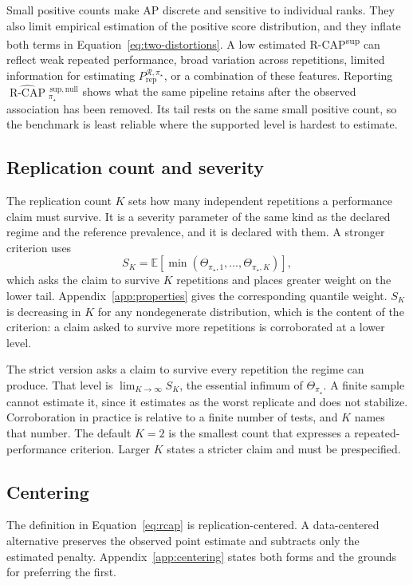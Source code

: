 \documentclass[11pt]{article}
\newcommand{\Regime}{\mathcal{R}}
\newcommand{\E}{\mathbb{E}}
\newcommand{\RCAPnullHat}{\widehat{\operatorname{R\text{-}CAP}}{}^{\,\mathrm{sup,null}}_{\pi_\star}}
\newcommand{\PRep}{P_{\mathrm{rep}}^{\Regime,\pi_\star}}
\theoremstyle{remark}
\begin{document}
Small positive counts make AP discrete and sensitive to individual ranks. They also limit empirical estimation of the positive score distribution, and they inflate both terms in Equation~\eqref{eq:two-distortions}. A low estimated R-CAP\textsuperscript{sup} can reflect weak repeated performance, broad variation across repetitions, limited information for estimating $\PRep$, or a combination of these features. Reporting $\RCAPnullHat$ shows what the same pipeline retains after the observed association has been removed. Its tail rests on the same small positive count, so the benchmark is least reliable where the supported level is hardest to estimate.

\subsection{Replication count and severity}

The replication count $K$ sets how many independent repetitions a performance claim must survive. It is a severity parameter of the same kind as the declared regime and the reference prevalence, and it is declared with them. A stronger criterion uses
\[
S_K
=
\E\left[
\min(\Theta_{\pi_\star,1},\ldots,\Theta_{\pi_\star,K})
\right],
\]
which asks the claim to survive $K$ repetitions and places greater weight on the lower tail. Appendix~\ref{app:properties} gives the corresponding quantile weight. $S_K$ is decreasing in $K$ for any nondegenerate distribution, which is the content of the criterion: a claim asked to survive more repetitions is corroborated at a lower level.

The strict version asks a claim to survive every repetition the regime can produce. That level is $\lim_{K\to\infty}S_K$, the essential infimum of $\Theta_{\pi_\star}$. A finite sample cannot estimate it, since it estimates as the worst replicate and does not stabilize. Corroboration in practice is relative to a finite number of tests, and $K$ names that number. The default $K=2$ is the smallest count that expresses a repeated-performance criterion. Larger $K$ states a stricter claim and must be prespecified.

\subsection{Centering}

The definition in Equation~\eqref{eq:rcap} is replication-centered. A data-centered alternative preserves the observed point estimate and subtracts only the estimated penalty. Appendix~\ref{app:centering} states both forms and the grounds for preferring the first.
\end{document}
